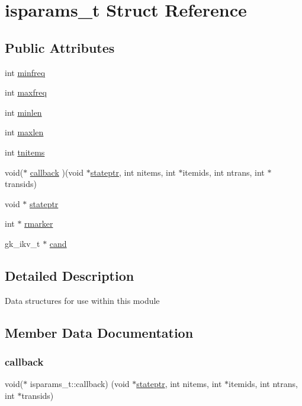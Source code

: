 \hypertarget{a00698}{}\section{isparams\+\_\+t Struct Reference}
\label{a00698}
\subsection*{Public Attributes}
\begin{DoxyCompactItemize}
\item 
int \hyperlink{a00698_a40906758bb0efc7e9c3fdff11d63c412}{minfreq}
\item 
int \hyperlink{a00698_a8ec053e88c745e5ff683e65aa5640205}{maxfreq}
\item 
int \hyperlink{a00698_a544a1225743a310e8dc7f75a9338cae8}{minlen}
\item 
int \hyperlink{a00698_afb1c5ef0ff2184fbd0c739e6ae401e1c}{maxlen}
\item 
int \hyperlink{a00698_aa8d4c3fc130ae48f825e6787f91817df}{tnitems}
\item 
void($\ast$ \hyperlink{a00698_a44008350a5cfced783ffcec870f1822d}{callback} )(void $\ast$\hyperlink{a00698_a11588df8c18be6e4a5721d68d917b2a7}{stateptr}, int nitems, int $\ast$itemids, int ntrans, int $\ast$transids)
\item 
void $\ast$ \hyperlink{a00698_a11588df8c18be6e4a5721d68d917b2a7}{stateptr}
\item 
int $\ast$ \hyperlink{a00698_ae83e2391121d3113b67ddd02c868eb6c}{rmarker}
\item 
gk\+\_\+ikv\+\_\+t $\ast$ \hyperlink{a00698_a714e82249e4f4e55b68721537a06e3bb}{cand}
\end{DoxyCompactItemize}


\subsection{Detailed Description}
Data structures for use within this module 

\subsection{Member Data Documentation}
\mbox{\label{a00698_a44008350a5cfced783ffcec870f1822d}} 
\subsubsection{\texorpdfstring{callback}{callback}}
{\footnotesize\ttfamily void($\ast$ isparams\+\_\+t\+::callback) (void $\ast$\hyperlink{a00698_a11588df8c18be6e4a5721d68d917b2a7}{stateptr}, int nitems, int $\ast$itemids, int ntrans, int $\ast$transids)}

